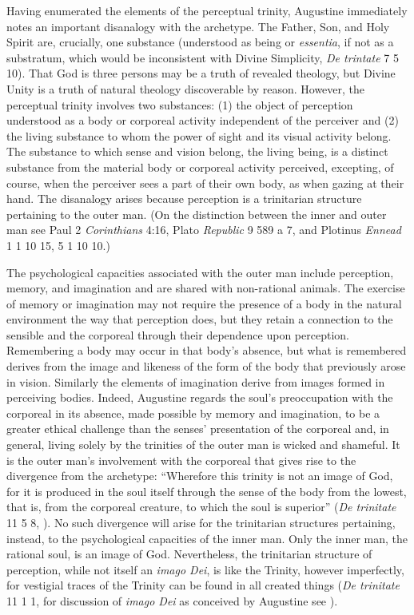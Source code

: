 \documentclass[12pt]{article}
\begin{document}
Having enumerated the elements of the perceptual trinity, Augustine immediately notes an important disanalogy with the archetype. The Father, Son, and Holy Spirit are, crucially, one substance (understood as being or \emph{essentia}, if not as a substratum, which would be inconsistent with Divine Simplicity, \emph{De trintate} 7 5 10). That God is three persons may be a truth of revealed theology, but Divine Unity is a truth of natural theology discoverable by reason. However, the perceptual trinity involves two substances: (1) the object of perception understood as a body or corporeal activity independent of the perceiver and (2) the living substance to whom the power of sight and its visual activity belong. The substance to which sense and vision belong, the living being, is a distinct substance from the material body or corporeal activity perceived, excepting, of course, when the perceiver sees a part of their own body, as when gazing at their hand. The disanalogy arises because perception is a trinitarian structure pertaining to the outer man. (On the distinction between the inner and outer man see Paul 2 \emph{Corinthians} 4:16, Plato \emph{Republic} 9 589 a 7, and Plotinus \emph{Ennead} 1 1 10 15, 5 1 10 10.) 

The psychological capacities associated with the outer man include perception, memory, and imagination and are shared with non-rational animals. The exercise of memory or imagination may not require the presence of a body in the natural environment the way that perception does, but they retain a connection to the sensible and the corporeal through their dependence upon perception. Remembering a body may occur in that body's absence, but what is remembered derives from the image and likeness of the form of the body that previously arose in vision. Similarly the elements of imagination derive from images formed in perceiving bodies. Indeed, Augustine regards the soul's preoccupation with the corporeal in its absence, made possible by memory and imagination, to be a greater ethical challenge than the senses' presentation of the corporeal and, in general, living solely by the trinities of the outer man is wicked and shameful. It is the outer man's involvement with the corporeal that gives rise to the divergence from the archetype: ``Wherefore this trinity is not an image of God, for it is produced in the soul itself through the sense of the body from the lowest, that is, from the corporeal creature, to which the soul is superior'' (\emph{De trinitate} 11 5 8, \citealt[70]{Matthews:2002ly}). No such divergence will arise for the trinitarian structures pertaining, instead, to the psychological capacities of the inner man. Only the inner man, the rational soul, is an image of God. Nevertheless, the trinitarian structure of perception, while not itself an \emph{imago Dei}, is like the Trinity, however imperfectly, for vestigial traces of the Trinity can be found in all created things (\emph{De trinitate} 11 1 1, for discussion of \emph{imago Dei} as conceived by Augustine see \citealt[chapter 11]{Gioia:2008zm}).
\end{document}
